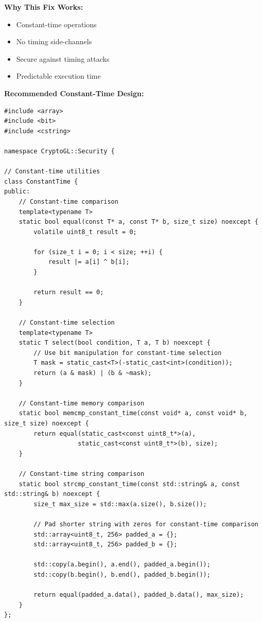 \documentclass[11pt,a4paper]{article}
\begin{document}
\textcolor{solutiongreen}{\textbf{Why This Fix Works:}}
\begin{itemize}
    \item Constant-time operations
    \item No timing side-channels
    \item Secure against timing attacks
    \item Predictable execution time
\end{itemize}

\textbf{Recommended Constant-Time Design:}
\begin{lstlisting}
#include <array>
#include <bit>
#include <cstring>

namespace CryptoGL::Security {

// Constant-time utilities
class ConstantTime {
public:
    // Constant-time comparison
    template<typename T>
    static bool equal(const T* a, const T* b, size_t size) noexcept {
        volatile uint8_t result = 0;
        
        for (size_t i = 0; i < size; ++i) {
            result |= a[i] ^ b[i];
        }
        
        return result == 0;
    }
    
    // Constant-time selection
    template<typename T>
    static T select(bool condition, T a, T b) noexcept {
        // Use bit manipulation for constant-time selection
        T mask = static_cast<T>(-static_cast<int>(condition));
        return (a & mask) | (b & ~mask);
    }
    
    // Constant-time memory comparison
    static bool memcmp_constant_time(const void* a, const void* b, size_t size) noexcept {
        return equal(static_cast<const uint8_t*>(a), 
                    static_cast<const uint8_t*>(b), size);
    }
    
    // Constant-time string comparison
    static bool strcmp_constant_time(const std::string& a, const std::string& b) noexcept {
        size_t max_size = std::max(a.size(), b.size());
        
        // Pad shorter string with zeros for constant-time comparison
        std::array<uint8_t, 256> padded_a = {};
        std::array<uint8_t, 256> padded_b = {};
        
        std::copy(a.begin(), a.end(), padded_a.begin());
        std::copy(b.begin(), b.end(), padded_b.begin());
        
        return equal(padded_a.data(), padded_b.data(), max_size);
    }
};


\end{lstlisting}
\end{document}
